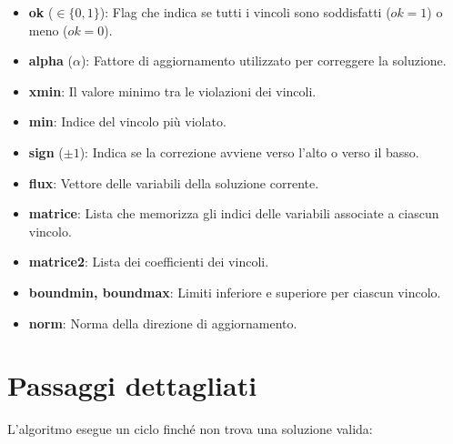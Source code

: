 \documentclass[a4paper,12pt]{article}
\begin{document}
\begin{itemize}
    \item \textbf{ok} ($\in \{0,1\}$): Flag che indica se tutti i vincoli sono soddisfatti ($ok=1$) o meno ($ok=0$).
    \item \textbf{alpha} ($\alpha$): Fattore di aggiornamento utilizzato per correggere la soluzione.
    \item \textbf{xmin}: Il valore minimo tra le violazioni dei vincoli.
    \item \textbf{min}: Indice del vincolo pi\`u violato.
    \item \textbf{sign} ($\pm1$): Indica se la correzione avviene verso l'alto o verso il basso.
    \item \textbf{flux}: Vettore delle variabili della soluzione corrente.
    \item \textbf{matrice}: Lista che memorizza gli indici delle variabili associate a ciascun vincolo.
    \item \textbf{matrice2}: Lista dei coefficienti dei vincoli.
    \item \textbf{boundmin, boundmax}: Limiti inferiore e superiore per ciascun vincolo.
    \item \textbf{norm}: Norma della direzione di aggiornamento.
\end{itemize}

\section{Passaggi dettagliati}
L'algoritmo esegue un ciclo finch\'e non trova una soluzione valida:
\end{document}

